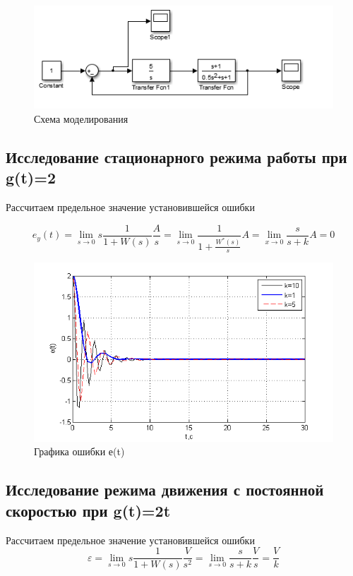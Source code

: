 \documentclass[a4paper, 11pt]{article}
\begin{document}
	\begin{figure}[h]
	\center\includegraphics[width=0.6\linewidth]{5}
		\caption{Схема моделирования}
		\label{fig:5}
	\end{figure}

\subsection{Исследование стационарного режима работы при g(t)=2}\hfill\par
Рассчитаем предельное значение установившейся ошибки

\begin{equation}
{e_y}(t) = \mathop {\lim }\limits_{s \to 0} s\frac{1}{{1 + W(s)}}\frac{A}{s} = \mathop {\lim }\limits_{s \to 0} \frac{1}{{1 + \frac{{{W^*}(s)}}{s}}}A = \mathop {\lim }\limits_{x \to 0} \frac{s}{{s + k}}A = 0
\end{equation}

	\begin{figure}[h]
		\centering
		\includegraphics[width=0.7\linewidth]{7}
		\caption{Графика ошибки е(t)}
		\label{fig:7}
	\end{figure}

\subsection{Исследование режима движения с постоянной скоростью при g(t)=2t}\hfill\par
Рассчитаем предельное значение установившейся ошибки
\begin{equation}
\varepsilon  = \mathop {\lim }\limits_{s \to 0} s\frac{1}{{1 + W(s)}}\frac{V}{{{s^2}}} = \mathop {\lim }\limits_{s \to 0} \frac{s}{{s + k}}\frac{V}{s} = \frac{V}{k}
\end{equation}
\end{document}
